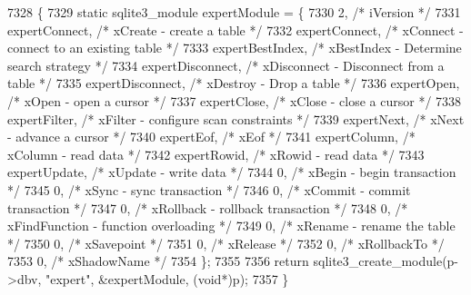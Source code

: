 \begin{DoxyCode}
7328                                             \{
7329   \textcolor{keyword}{static} sqlite3_module expertModule = \{
7330     2,                            \textcolor{comment}{/* iVersion */}
7331     expertConnect,                \textcolor{comment}{/* xCreate - create a table */}
7332     expertConnect,                \textcolor{comment}{/* xConnect - connect to an existing table */}
7333     expertBestIndex,              \textcolor{comment}{/* xBestIndex - Determine search strategy */}
7334     expertDisconnect,             \textcolor{comment}{/* xDisconnect - Disconnect from a table */}
7335     expertDisconnect,             \textcolor{comment}{/* xDestroy - Drop a table */}
7336     expertOpen,                   \textcolor{comment}{/* xOpen - open a cursor */}
7337     expertClose,                  \textcolor{comment}{/* xClose - close a cursor */}
7338     expertFilter,                 \textcolor{comment}{/* xFilter - configure scan constraints */}
7339     expertNext,                   \textcolor{comment}{/* xNext - advance a cursor */}
7340     expertEof,                    \textcolor{comment}{/* xEof */}
7341     expertColumn,                 \textcolor{comment}{/* xColumn - read data */}
7342     expertRowid,                  \textcolor{comment}{/* xRowid - read data */}
7343     expertUpdate,                 \textcolor{comment}{/* xUpdate - write data */}
7344     0,                            \textcolor{comment}{/* xBegin - begin transaction */}
7345     0,                            \textcolor{comment}{/* xSync - sync transaction */}
7346     0,                            \textcolor{comment}{/* xCommit - commit transaction */}
7347     0,                            \textcolor{comment}{/* xRollback - rollback transaction */}
7348     0,                            \textcolor{comment}{/* xFindFunction - function overloading */}
7349     0,                            \textcolor{comment}{/* xRename - rename the table */}
7350     0,                            \textcolor{comment}{/* xSavepoint */}
7351     0,                            \textcolor{comment}{/* xRelease */}
7352     0,                            \textcolor{comment}{/* xRollbackTo */}
7353     0,                            \textcolor{comment}{/* xShadowName */}
7354   \};
7355 
7356   \textcolor{keywordflow}{return} sqlite3_create_module(p->dbv, \textcolor{stringliteral}{"expert"}, &expertModule, (\textcolor{keywordtype}{void}*)p);
7357 \}
\end{DoxyCode}
\mbox{\label{shell_8c_ad8b9cf147e719b32c3d6650149a7d180}} 
